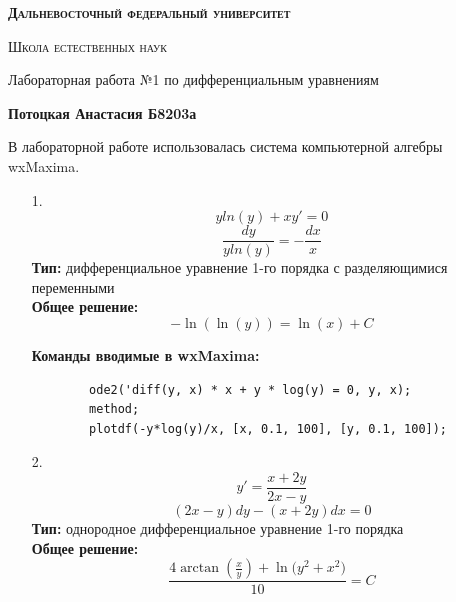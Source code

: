\documentclass[a4paper, 12pt, oneside]{scrartcl}
\begin{document}
	\begin{center}
	{\scshape\Large\bfseries Дальневосточный федеральный университет \par}
	{\scshape\Large Школа естественных наук \par}
	{\large Лабораторная работа №1 по дифференциальным уравнениям \par}
	{\large\bfseries Потоцкая Анастасия Б8203а \par}
	\end{center}
	В лабораторной работе использовалась система компьютерной алгебры wxMaxima. 
		\begin{enumerate}

		\item[1.]
		$$yln(y) + xy' = 0$$
		$$\frac{dy}{yln(y)} = -\frac{dx}{x}$$ 
		\textbf{Тип:}
		дифференциальное уравнение 1-го порядка с разделяющимися переменными \\

		\textbf{Общее решение:}
		$$-\ln{(\ln{(y)})} = \ln{(x)} + C$$

		\textbf{Команды вводимые в wxMaxima: }
		\begin{verbatim}
		ode2('diff(y, x) * x + y * log(y) = 0, y, x);
		method;
		plotdf(-y*log(y)/x, [x, 0.1, 100], [y, 0.1, 100]);
		\end{verbatim} 
		\begin{figure}[ht]
		\end{figure}
		
		\item[2.]
		$$y' = \frac{x + 2y}{2x - y}$$
		$$(2x - y)dy - (x + 2y)dx = 0 $$
		\textbf{Тип: } однородное дифференциальное уравнение 1-го порядка \\
		
		\textbf{Общее решение: }
		$$\frac{4\arctan{(\frac{x}{y})} + \ln{(y^{2} + x^{2}})}{10} = C$$
		

\end{enumerate}
\end{document}
